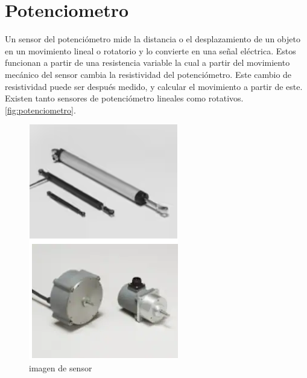 	\section{Potenciometro}
Un sensor del potenciómetro mide la distancia o el desplazamiento de un objeto en un movimiento lineal o rotatorio y lo convierte en una señal eléctrica. Estos funcionan\cite{TE_Potentiometer} a partir de una resistencia variable la cual a partir del movimiento mecánico del sensor cambia la resistividad del potenciómetro. Este cambio de resistividad puede ser después medido, y calcular el movimiento a partir de este. Existen tanto sensores de potenciómetro lineales como rotativos.\autoref{fig:potenciometro}.
	\begin{figure}[h]
		\centering
		\includegraphics[width=0.3\linewidth]{img/potenciometro}
		\caption{imagen de sensor}
		\label{fig:potenciometro}
	\end{figure}
